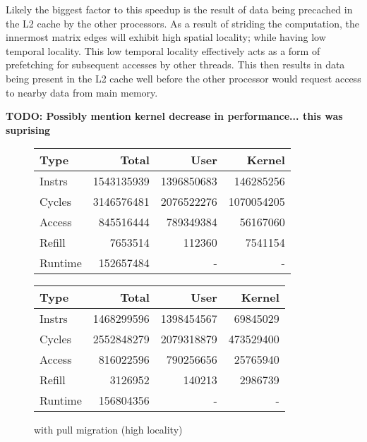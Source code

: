 \documentclass[11pt]{article}
\begin{document}
Likely the biggest factor to this speedup is the result of data being precached in the L2 cache by the other processors.  As a result of striding the computation, the innermost matrix edges will exhibit high spatial locality; while having low temporal locality.  This low temporal locality effectively acts as a form of prefetching for subsequent accesses by other threads.  This then results in data being present in the L2 cache well before the other processor would request access to nearby data from main memory.  

\textbf{TODO: Possibly mention kernel decrease in performance... this was suprising}

\begin{figure*}[!h]
	\caption{60 threads consisting of 48 hard processes and 12 easy processes}	
	\centering
	\begin{subtable}{.48\linewidth}
		\centering                 
		\begin{tabular}{l|rrr}
			Type    & Total      & User       & Kernel     \\
			\hline
			Instrs  & 1543135939 & 1396850683 & 146285256  \\ 
			Cycles  & 3146576481 & 2076522276 & 1070054205 \\ 
			Access  & 845516444  & 789349384  & 56167060   \\ 
			Refill  & 7653514    & 112360     & 7541154    \\ 
			Runtime & 152657484  & -          & -          \\
			\hline 
		\end{tabular}
		\caption{without pull migration (high locality)}
	\end{subtable}
	\hfill
	\begin{subtable}{.48\linewidth}
		\begin{tabular}{l|rrr}
			Type    & Total      & User       & Kernel    \\
			\hline
			Instrs  & 1468299596 & 1398454567 & 69845029  \\ 
			Cycles  & 2552848279 & 2079318879 & 473529400 \\ 
			Access  & 816022596  & 790256656  & 25765940  \\ 
			Refill  & 3126952    & 140213     & 2986739   \\ 
			Runtime & 156804356  & -          & -         \\
			\hline
		\end{tabular}
		\caption{with pull migration (high locality)}
	\end{subtable}

\end{figure*}
\end{document}
